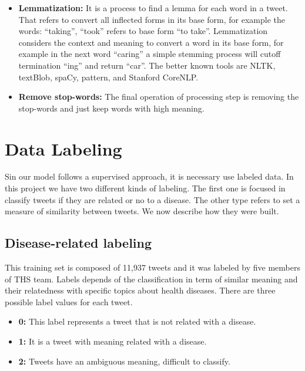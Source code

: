\documentclass[12pt]{report}
\begin{document}
\begin{itemize}[nolistsep]
	\item \textbf{Lemmatization:} It is a process to find a lemma for each word in a tweet. That refers to convert all inflected forms in its base form, for example the words: “taking”, “took” refers to base form “to take”. Lemmatization considers the context and meaning to convert a word in its base form, for example in the next word “caring” a simple stemming process will cutoff termination “ing” and return “car”. %
	The better known tools are \ac{NLTK}, textBlob, spaCy, pattern, and Stanford CoreNLP. 

	\item \textbf{Remove stop-words:} The final operation of processing step is removing the stop-words and just keep words with high meaning.
\end{itemize}

\section{Data Labeling} \label{data_labeling}

Sin our model follows a supervised approach, it is necessary use labeled data. In this project we have two different kinds of labeling. The first one is focused in classify tweets if they are related or no to a disease. The other type refers to set a measure of similarity between tweets. We now describe how they were built.

\subsection{Disease-related labeling}

This training set is composed of 11,937 tweets and it was labeled by five members of \ac{THS} team. Labels depends of the classification in term of similar meaning and their relatedness with specific topics about health diseases. There are three possible label values for each tweet. 

\begin{itemize} [nolistsep]
	\item \textbf{0:} This label represents a tweet that is not related with a disease. 
	\item \textbf{1:} It is a tweet with meaning  related with a disease.
	\item \textbf{2:} Tweets have an ambiguous meaning, difficult to classify.
\end{itemize}
\end{document}
